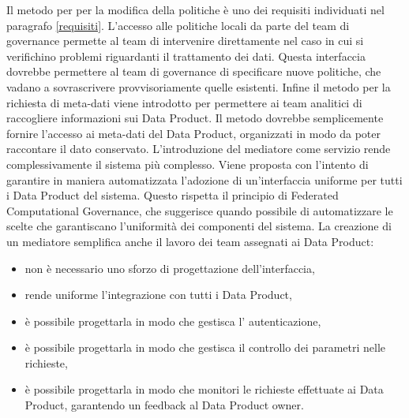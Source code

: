 \documentclass[12pt]{report}
\begin{document}
Il metodo per per la modifica della politiche è uno dei requisiti individuati nel paragrafo \ref{requisiti}.
L'accesso alle politiche locali da parte del team di governance permette al team di intervenire direttamente nel caso in cui si verifichino problemi riguardanti il trattamento dei dati.
Questa interfaccia dovrebbe permettere al team di governance di specificare nuove politiche, che vadano a sovrascrivere provvisoriamente quelle esistenti.
Infine il metodo per la richiesta di meta-dati viene introdotto per permettere ai team analitici di raccogliere informazioni sui Data Product.
Il metodo dovrebbe semplicemente fornire l'accesso ai meta-dati del Data Product, organizzati in modo da poter raccontare il dato conservato.
L'introduzione del mediatore come servizio rende complessivamente il sistema più complesso.
Viene proposta con l'intento di garantire in maniera automatizzata l'adozione di un'interfaccia uniforme per tutti i Data Product del sistema.
Questo rispetta il principio di Federated Computational Governance, che suggerisce quando possibile di automatizzare le scelte che garantiscano l'uniformità dei componenti del sistema.
La creazione di un mediatore semplifica anche il lavoro dei team assegnati ai Data Product:
\begin{itemize}
    \item non è necessario uno sforzo di progettazione dell'interfaccia, 
    \item rende uniforme l'integrazione con tutti i Data Product,
    \item è possibile progettarla in modo che gestisca l' autenticazione,
    \item è possibile progettarla in modo che gestisca il controllo dei parametri nelle richieste,
    \item è possibile progettarla in modo che monitori le richieste effettuate ai Data Product, garantendo un feedback al Data Product owner.
\end{itemize}
\end{document}
